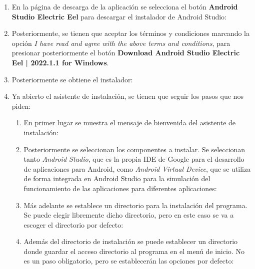     \begin{enumerate}
        \item En la página de descarga de la aplicación se selecciona el botón \textbf{Android Studio Electric Eel} para descargar el instalador de Android Studio:
        \item Posteriormente, se tienen que aceptar los términos y condiciones marcando la opción \textit{I have read and agree with the above terms and conditions}, para presionar posteriormente el botón \textbf{Download Android Studio Electric Eel | 2022.1.1 for Windows}.
        \item Posteriormente se obtiene el instalador:
        \item Ya abierto el asistente de instalación, se tienen que seguir los pasos que nos piden:
        \begin{enumerate}
            \item En primer lugar se muestra el mensaje de bienvenida del asistente de instalación:
            \item Posteriormente se seleccionan los componentes a instalar. Se seleccionan tanto \textit{Android Studio}, que es la propia IDE de Google para el desarrollo de aplicaciones para Android, como \textit{Android Virtual Device}, que se utiliza de forma integrada en Android Studio para la simulación del funcionamiento de las aplicaciones para diferentes aplicaciones:
            \item Más adelante se establece un directorio para la instalación del programa. Se puede elegir libremente dicho directorio, pero en este caso se va a escoger el directorio por defecto:
            \item Además del directorio de instalación se puede establecer un directorio donde guardar el acceso directorio al programa en el menú de inicio. No es un paso obligatorio, pero se establecerán las opciones por defecto:

\end{enumerate}
\end{enumerate}
